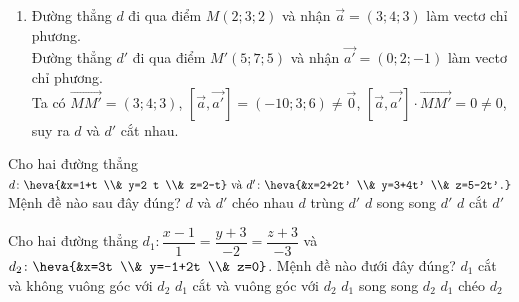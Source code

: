 \begin{vd}
{\begin{enumerate}
			Đường thẳng $d'$ đi qua điểm $M'(4;1;5)$ và nhận $\overrightarrow{a'}=(3;4;5)$ làm vectơ chỉ phương.\\
			Ta có $\overrightarrow{MM'}=(2;-2;4)$, $\left[ \overrightarrow{a}, \overrightarrow{a'} \right] = (14;-3;-6) \ne \overrightarrow{0}$, $\left[ \overrightarrow{a}, \overrightarrow{a'} \right] \cdot \overrightarrow{MM'} =10 \ne 0$, suy ra $d$ và $d'$ chéo nhau.
			\item Đường thẳng $d$ đi qua điểm $M(2;3;2)$ và nhận $\overrightarrow{a}=(3;4;3)$ làm vectơ chỉ phương.\\
			Đường thẳng $d'$ đi qua điểm $M'(5;7;5)$ và nhận $\overrightarrow{a'}=(0;2;-1)$ làm vectơ chỉ phương.\\
			Ta có $\overrightarrow{MM'}=(3;4;3)$, $\left[ \overrightarrow{a}, \overrightarrow{a'} \right] = (-10;3;6) \ne \overrightarrow{0}$, $\left[ \overrightarrow{a}, \overrightarrow{a'} \right] \cdot \overrightarrow{MM'} =0 \ne 0$, suy ra $d$ và $d'$ cắt nhau.
		\end{enumerate}
	}
\end{vd}
\baitaptn
\setcounter{ex}{0}

\begin{ex} %
	Cho hai đường thẳng $d\colon \heva{&x=1+t \\& y=2 t \\& z=2-t} \text{ và } d'\colon \heva{&x=2+2t' \\& y=3+4t' \\& z=5-2t'.}$ Mệnh đề nào sau đây đúng?
	\choice
	{$d$ và $d'$ chéo nhau}
	{$d$ trùng $d'$}
	{\True $d$ song song $d'$}
	{$d$ cắt $d'$}
\end{ex}


\begin{ex} %
	Cho hai đường thẳng $d_1 \colon \dfrac{x-1}{1}=\dfrac{y+3}{-2}=\dfrac{z+3}{-3}$ và $d_2\colon \heva{&x=3t \\& y=-1+2t \\& z=0}$. Mệnh đề nào đưới đây đúng?
	\choice
	{\True $d_1$ cắt và không vuông góc với $d_2$}
	{$d_1$ cắt và vuông góc với $d_2$}
	{$d_1$ song song $d_2$}
	{$d_1$ chéo $d_2$}
\end{ex}

